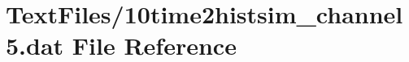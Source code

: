 \hypertarget{10time2histsim__channel5_8dat}{}\section{Text\+Files/10time2histsim\+\_\+channel5.dat File Reference}
\label{10time2histsim__channel5_8dat}
